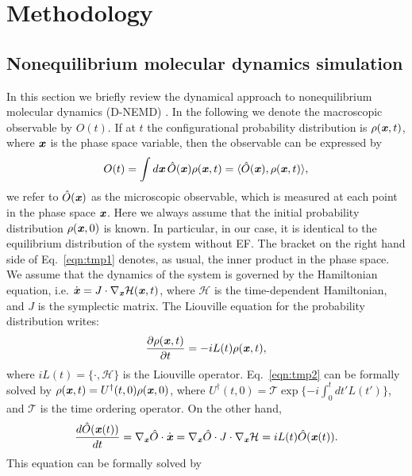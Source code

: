 \documentclass[a4paper,preprint,unsortedaddress,onecolumn]{revtex4-1}
\newcommand{\vect}[1]{\textbf{\textit{#1}}}
\begin{document}
\section{Methodology}
\subsection{Nonequilibrium molecular dynamics simulation}
In this section we briefly review the dynamical approach to nonequilibrium
molecular dynamics (D-NEMD) \cite{ciccotti1975direct, ciccotti1979thought,
  orlandini2011hydrodynamics, orlandini2011hydrodynamics-01}.
In the following we denote the macroscopic observable by $O(t)$. If at $t$
the configurational probability distribution is $\rho(\vect x, t)$, where
$\vect x$ is the phase space variable, then the observable can be
expressed by
\begin{align}\label{eqn:tmp1}
  O(t) = \int d\vect x\, \hat O(\vect x)\rho(\vect x, t)  = \langle \hat O(\vect x), \rho(\vect x, t)\rangle,
\end{align}
we refer to $\hat O (\vect x)$ as the microscopic observable, 
which is measured at each point in the phase space $\vect x$.
Here we always assume that the initial probability distribution
$\rho(\vect x, 0)$ is known. In particular, in our case,
it is identical to the equilibrium distribution of the system
without EF.
The bracket on the right hand side of Eq.~\eqref{eqn:tmp1} denotes, as usual, the inner product in the
phase space.  We assume that the dynamics of the system is governed by the
Hamiltonian equation, i.e. $\dot {\vect x} = J \cdot \nabla_{\vect x}
\mathcal H(\vect x, t)$, where $\mathcal H$ is the time-dependent Hamiltonian,
and $J$ is
the symplectic matrix. The Liouville equation for the probability
distribution writes:
\begin{align}\label{eqn:tmp2}
  \frac{\partial \rho(\vect x, t)}{\partial t} = - iL(t) \rho(\vect x, t),
\end{align}
where $iL(t) = \{\cdot, \mathcal H\}$ is the Liouville operator.
Eq.~\eqref{eqn:tmp2}
can be formally solved by $\rho(\vect x, t) = U^\dagger(t,0) \rho(\vect x, 0)$,
{where $U^\dagger(t,0) = \mathcal T\exp\{-i \int_0^t d t' L(t')\}$, and $\mathcal T$ is the time ordering operator.}
On the other hand,
\begin{align}
  \frac{d \hat O(\vect x(t))}{dt} = \nabla_{\vect x}\hat O\cdot \dot{\vect x}
  = \nabla_{\vect x}\hat O\cdot J\cdot \nabla_{\vect x}\mathcal H
  = iL(t) \hat O (\vect x(t)).
\end{align}
This equation can be formally solved by
\end{document}
